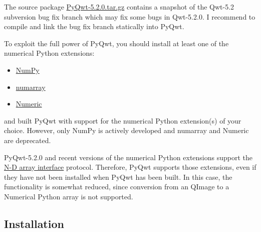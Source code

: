 \documentclass[a4paper,10pt,english]{manual}
\begin{document}
The source package
\href{http://prdownloads.sourceforge.net/pyqwt/PyQwt-5.2.0.tar.gz}{PyQwt-5.2.0.tar.gz}
contains a snapshot of the Qwt-5.2 subversion bug fix branch which may
fix some bugs in Qwt-5.2.0.
I recommend to compile and link the bug fix branch statically into PyQwt.

To exploit the full power of PyQwt, you should install at least one of
the numerical Python extensions:
\begin{itemize}
\item {} 
\href{http://www.scipy.org/NumPy}{NumPy}

\item {} 
\href{http://www.stsci.edu/resources/software\_hardware/numarray}{numarray}

\item {} 
\href{http://numpy.scipy.org/}{Numeric}

\end{itemize}

and built PyQwt with support for the numerical Python extension(s) of
your choice.  However, only NumPy is actively developed and numarray and
Numeric are deprecated.

PyQwt-5.2.0 and recent versions of the numerical Python extensions support
the \href{http://numpy.scipy.org/array\_interface.shtml}{N-D array interface}
protocol.  Therefore, PyQwt supports those extensions, even if they have not
been installed when PyQwt has been built. In this case, the functionality is
somewhat reduced, since conversion from an QImage to a Numerical
Python array is not supported.


\subsection{Installation}
\end{document}
